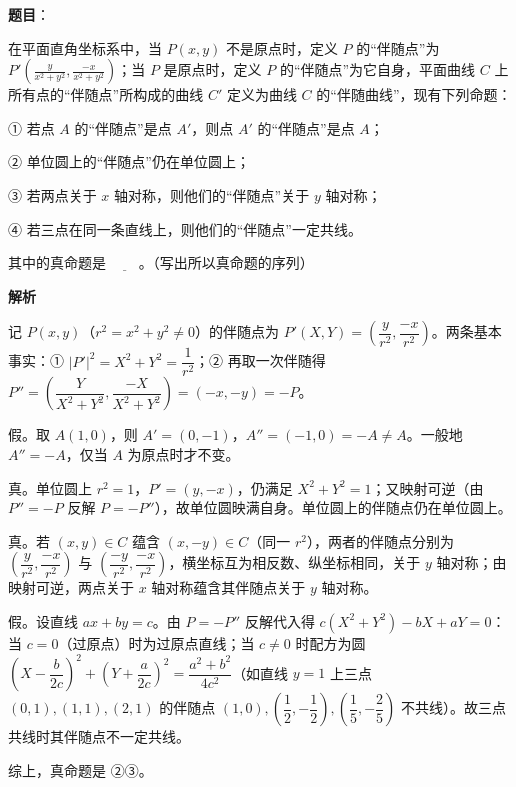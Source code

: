 \begin{answer}

\textbf{题目}：

在平面直角坐标系中，当 \(P(x,y)\) 不是原点时，定义 \(P\) 的“伴随点”为 \(P'\left(\frac{y}{x^{2}+y^{2}},\frac{-x}{x^{2}+y^{2}}\right)\)；当 \(P\) 是原点时，定义 \(P\) 的“伴随点”为它自身，平面曲线 \(C\) 上所有点的“伴随点”所构成的曲线 \(C'\) 定义为曲线 \(C\) 的“伴随曲线”，现有下列命题：

① 若点 \(A\) 的“伴随点”是点 \(A'\)，则点 \(A'\) 的“伴随点”是点 \(A\)；

② 单位圆上的“伴随点”仍在单位圆上；

③ 若两点关于 \(x\) 轴对称，则他们的“伴随点”关于 \(y\) 轴对称；

④ 若三点在同一条直线上，则他们的“伴随点”一定共线。

其中的真命题是 \(\underline{\qquad}\)。（写出所以真命题的序列）

\textbf{解析}

记 \(P(x,y)\)（\(r^{2}=x^{2}+y^{2}\neq0\)）的伴随点为 \(P'(X,Y)=\left(\dfrac{y}{r^{2}},\dfrac{-x}{r^{2}}\right)\)。两条基本事实：① \(|P'|^{2}=X^{2}+Y^{2}=\dfrac{1}{r^{2}}\)；② 再取一次伴随得 \(P''=\left(\dfrac{Y}{X^{2}+Y^{2}},\dfrac{-X}{X^{2}+Y^{2}}\right)=(-x,-y)=-P\)。


假。取 \(A(1,0)\)，则 \(A'=(0,-1)\)，\(A''=(-1,0)=-A\neq A\)。一般地 \(A''=-A\)，仅当 \(A\) 为原点时才不变。


真。单位圆上 \(r^{2}=1\)，\(P'=(y,-x)\)，仍满足 \(X^{2}+Y^{2}=1\)；又映射可逆（由 \(P''=-P\) 反解 \(P=-P''\)），故单位圆映满自身。单位圆上的伴随点仍在单位圆上。


真。若 \((x,y)\in C\) 蕴含 \((x,-y)\in C\)（同一 \(r^{2}\)），两者的伴随点分别为 \(\left(\dfrac{y}{r^{2}},\dfrac{-x}{r^{2}}\right)\) 与 \(\left(\dfrac{-y}{r^{2}},\dfrac{-x}{r^{2}}\right)\)，横坐标互为相反数、纵坐标相同，关于 \(y\) 轴对称；由映射可逆，两点关于 \(x\) 轴对称蕴含其伴随点关于 \(y\) 轴对称。


假。设直线 \(ax+by=c\)。由 \(P=-P''\) 反解代入得 \(c(X^{2}+Y^{2})-bX+aY=0\)：当 \(c=0\)（过原点）时为过原点直线；当 \(c\neq0\) 时配方为圆 \(\left(X-\dfrac{b}{2c}\right)^{2}+\left(Y+\dfrac{a}{2c}\right)^{2}=\dfrac{a^{2}+b^{2}}{4c^{2}}\)（如直线 \(y=1\) 上三点 \((0,1),(1,1),(2,1)\) 的伴随点 \((1,0),\left(\dfrac{1}{2},-\dfrac{1}{2}\right),\left(\dfrac{1}{5},-\dfrac{2}{5}\right)\) 不共线）。故三点共线时其伴随点不一定共线。

综上，真命题是 ②③。


\end{answer}
